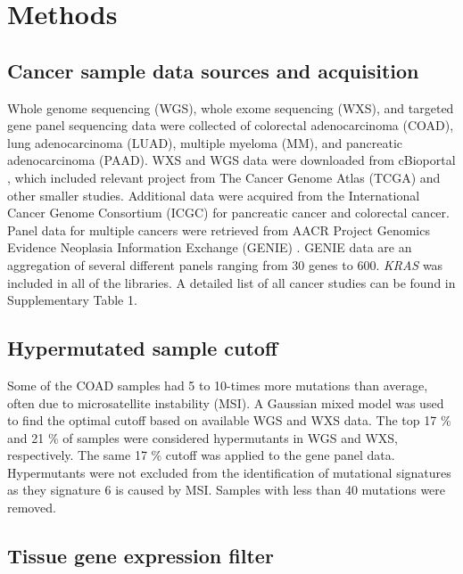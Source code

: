 \documentclass[english, 12pt, letterpaper]{article}
\newcommand{\KRAS}{\emph{KRAS}}
\begin{document}
\section*{Methods}

\subsection*{Cancer sample data sources and acquisition}

Whole genome sequencing (WGS), whole exome sequencing (WXS), and targeted gene panel sequencing data were collected of colorectal adenocarcinoma (COAD), lung adenocarcinoma (LUAD), multiple myeloma (MM), and pancreatic adenocarcinoma (PAAD).
WXS and WGS data were downloaded from cBioportal \cite{Gao2013, Cerami2012}, which included relevant project from The Cancer Genome Atlas (TCGA) \cite{CancerGenomeAtlasNetwork2012, CancerGenomeAtlasResearchNetwork2014, CancerGenomeAtlasResearchNetwork.Electronicaddress:andrew_aguirredfci.harvard.edu2017} and other smaller studies. 
Additional data were acquired from the International Cancer Genome Consortium (ICGC) for pancreatic cancer \cite{Scarlett2011} and colorectal cancer. 
Panel data for multiple cancers were retrieved from AACR Project Genomics Evidence Neoplasia Information Exchange (GENIE) \cite{AACRProjectGENIEConsortium2017AACRConsortium.}.
GENIE data are an aggregation of several different panels ranging from 30 genes to 600.
\KRAS{} was included in all of the libraries. 
A detailed list of all cancer studies can be found in Supplementary Table 1. %


\subsection*{Hypermutated sample cutoff}

Some of the COAD samples had 5 to 10-times more mutations than average, often due to microsatellite instability (MSI). 
A Gaussian mixed model was used to find the optimal cutoff based on available WGS and WXS data. 
The top 17 \% and 21 \% of samples were considered hypermutants in WGS and WXS, respectively.
The same 17 \% cutoff was applied to the gene panel data. 
Hypermutants were not excluded from the identification of mutational signatures as they signature 6 is caused by MSI.
Samples with less than 40 mutations were removed.


\subsection*{Tissue gene expression filter}
\end{document}
